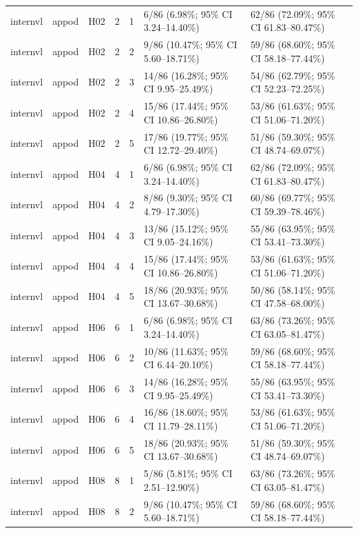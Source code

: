 \begin{longtable}{lllrrll}
internvl & appod & H02 & 2 & 1 & 6/86 (6.98\%; 95\% CI 3.24–14.40\%) & 62/86 (72.09\%; 95\% CI 61.83–80.47\%) \\
internvl & appod & H02 & 2 & 2 & 9/86 (10.47\%; 95\% CI 5.60–18.71\%) & 59/86 (68.60\%; 95\% CI 58.18–77.44\%) \\
internvl & appod & H02 & 2 & 3 & 14/86 (16.28\%; 95\% CI 9.95–25.49\%) & 54/86 (62.79\%; 95\% CI 52.23–72.25\%) \\
internvl & appod & H02 & 2 & 4 & 15/86 (17.44\%; 95\% CI 10.86–26.80\%) & 53/86 (61.63\%; 95\% CI 51.06–71.20\%) \\
internvl & appod & H02 & 2 & 5 & 17/86 (19.77\%; 95\% CI 12.72–29.40\%) & 51/86 (59.30\%; 95\% CI 48.74–69.07\%) \\
internvl & appod & H04 & 4 & 1 & 6/86 (6.98\%; 95\% CI 3.24–14.40\%) & 62/86 (72.09\%; 95\% CI 61.83–80.47\%) \\
internvl & appod & H04 & 4 & 2 & 8/86 (9.30\%; 95\% CI 4.79–17.30\%) & 60/86 (69.77\%; 95\% CI 59.39–78.46\%) \\
internvl & appod & H04 & 4 & 3 & 13/86 (15.12\%; 95\% CI 9.05–24.16\%) & 55/86 (63.95\%; 95\% CI 53.41–73.30\%) \\
internvl & appod & H04 & 4 & 4 & 15/86 (17.44\%; 95\% CI 10.86–26.80\%) & 53/86 (61.63\%; 95\% CI 51.06–71.20\%) \\
internvl & appod & H04 & 4 & 5 & 18/86 (20.93\%; 95\% CI 13.67–30.68\%) & 50/86 (58.14\%; 95\% CI 47.58–68.00\%) \\
internvl & appod & H06 & 6 & 1 & 6/86 (6.98\%; 95\% CI 3.24–14.40\%) & 63/86 (73.26\%; 95\% CI 63.05–81.47\%) \\
internvl & appod & H06 & 6 & 2 & 10/86 (11.63\%; 95\% CI 6.44–20.10\%) & 59/86 (68.60\%; 95\% CI 58.18–77.44\%) \\
internvl & appod & H06 & 6 & 3 & 14/86 (16.28\%; 95\% CI 9.95–25.49\%) & 55/86 (63.95\%; 95\% CI 53.41–73.30\%) \\
internvl & appod & H06 & 6 & 4 & 16/86 (18.60\%; 95\% CI 11.79–28.11\%) & 53/86 (61.63\%; 95\% CI 51.06–71.20\%) \\
internvl & appod & H06 & 6 & 5 & 18/86 (20.93\%; 95\% CI 13.67–30.68\%) & 51/86 (59.30\%; 95\% CI 48.74–69.07\%) \\
internvl & appod & H08 & 8 & 1 & 5/86 (5.81\%; 95\% CI 2.51–12.90\%) & 63/86 (73.26\%; 95\% CI 63.05–81.47\%) \\
internvl & appod & H08 & 8 & 2 & 9/86 (10.47\%; 95\% CI 5.60–18.71\%) & 59/86 (68.60\%; 95\% CI 58.18–77.44\%) \\

\end{longtable}
